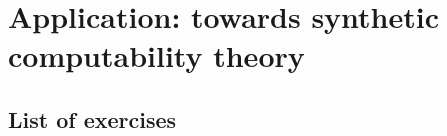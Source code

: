 \chapter{Application: towards synthetic computability theory}\label{chap:synthetic}


\section{List of exercises}

